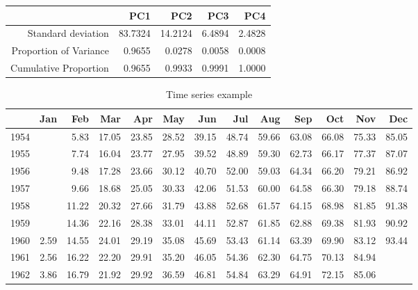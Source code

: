 \documentclass{article}
\begin{document}
\begin{table}[ht]
\begin{center}
\begin{tabular}{rrrrr}
\hline
 & PC1 & PC2 & PC3 & PC4 \\
\hline
Standard deviation & 83.7324 & 14.2124 & 6.4894 & 2.4828 \\
Proportion of Variance & 0.9655 & 0.0278 & 0.0058 & 0.0008 \\
Cumulative Proportion & 0.9655 & 0.9933 & 0.9991 & 1.0000 \\
\hline
\end{tabular}
\end{center}
\end{table}
\begin{table}[h]
\begin{center}
\caption{Time series example}
\begin{tabular}{rrrrrrrrrrrrr}
\hline
 & Jan & Feb & Mar & Apr & May & Jun & Jul & Aug & Sep & Oct & Nov & Dec \\
\hline
1954 &  & 5.83 & 17.05 & 23.85 & 28.52 & 39.15 & 48.74 & 59.66 & 63.08 & 66.08 & 75.33 & 85.05 \\
1955 &  & 7.74 & 16.04 & 23.77 & 27.95 & 39.52 & 48.89 & 59.30 & 62.73 & 66.17 & 77.37 & 87.07 \\
1956 &  & 9.48 & 17.28 & 23.66 & 30.12 & 40.70 & 52.00 & 59.03 & 64.34 & 66.20 & 79.21 & 86.92 \\
1957 &  & 9.66 & 18.68 & 25.05 & 30.33 & 42.06 & 51.53 & 60.00 & 64.58 & 66.30 & 79.18 & 88.74 \\
1958 &  & 11.22 & 20.32 & 27.66 & 31.79 & 43.88 & 52.68 & 61.57 & 64.15 & 68.98 & 81.85 & 91.38 \\
1959 &  & 14.36 & 22.16 & 28.38 & 33.01 & 44.11 & 52.87 & 61.85 & 62.88 & 69.38 & 81.93 & 90.92 \\
1960 & 2.59 & 14.55 & 24.01 & 29.19 & 35.08 & 45.69 & 53.43 & 61.14 & 63.39 & 69.90 & 83.12 & 93.44 \\
1961 & 2.56 & 16.22 & 22.20 & 29.91 & 35.20 & 46.05 & 54.36 & 62.30 & 64.75 & 70.13 & 84.94 &  \\
1962 & 3.86 & 16.79 & 21.92 & 29.92 & 36.59 & 46.81 & 54.84 & 63.29 & 64.91 & 72.15 & 85.06 &  \\
\hline
\end{tabular}
\end{center}
\end{table}
\end{document}
